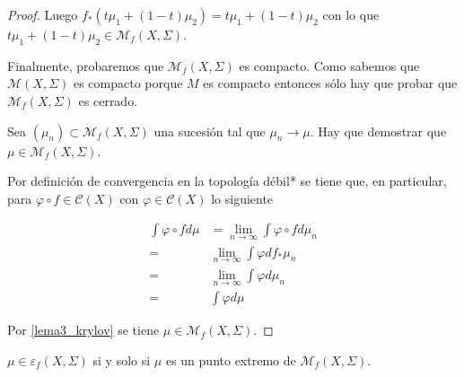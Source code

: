 \begin{proof}
	Luego $f_*(t\mu_1 + (1-t)\mu_2) = t\mu_1 + (1-t)\mu_2$ con lo que \mbox{$t\mu_1 + (1-t)\mu_2 \in \mathcal{M}_f(X,\Sigma)$}.
	
	Finalmente, probaremos que $\mathcal{M}_f(X,\Sigma)$ es compacto. Como sabemos que $\mathcal{M}(X,\Sigma)$ es compacto porque $M$ es compacto entonces sólo hay que probar que $\mathcal{M}_f(X,\Sigma)$ es cerrado.
	
	Sea $(\mu_n) \subset \mathcal{M}_f(X,\Sigma)$ una sucesión tal que $\mu_n \rightarrow \mu$. Hay que demostrar que $\mu \in \mathcal{M}_f(X,\Sigma)$.
	
	Por definición de convergencia en la topología débil* se tiene que, en particular, para $\varphi \circ f \in \mathcal{C}(X)$ con $\varphi \in \mathcal{C}(X)$ lo siguiente
	
	\begin{align}
	\int \varphi \circ f d\mu &= \lim_{n \rightarrow \infty} \int \varphi \circ f d\mu_n\\
	=& \lim_{n \rightarrow \infty} \int \varphi df_*\mu_n\\
	=& \lim_{n \rightarrow \infty} \int \varphi d\mu_n\\
	=& \int \varphi d\mu
	\end{align}
	
	Por \ref{lema3_krylov} se tiene $\mu \in \mathcal{M}_f(X,\Sigma)$.
\end{proof}

\begin{teorema}
	$\mu \in \varepsilon_f(X,\Sigma)$ si y solo si $\mu$ es un punto extremo de $\mathcal{M}_f(X,\Sigma)$.
\end{teorema}

